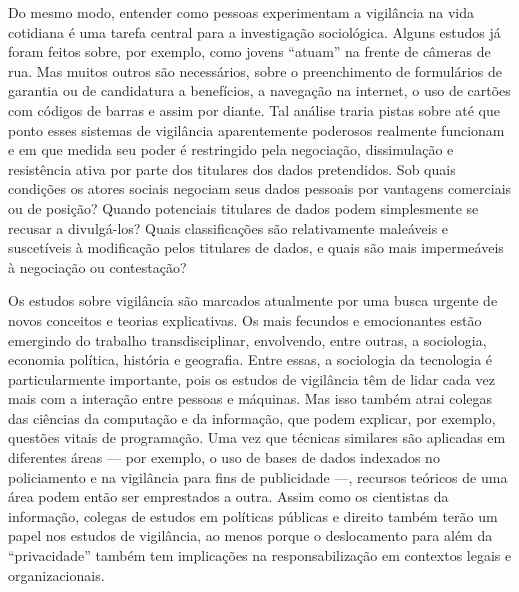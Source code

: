Do mesmo modo, entender como pessoas experimentam a vigilância na vida
cotidiana é uma tarefa central para a investigação sociológica. Alguns
estudos já foram feitos sobre, por exemplo, como jovens ``atuam'' na
frente de câmeras de rua. Mas muitos outros são necessários, sobre o
preenchimento de formulários de garantia ou de candidatura a benefícios,
a navegação na internet, o uso de cartões com códigos de barras e assim
por diante. Tal análise traria pistas sobre até que ponto esses sistemas
de vigilância aparentemente poderosos realmente funcionam e em que
medida seu poder é restringido pela negociação, dissimulação e
resistência ativa por parte dos titulares dos dados pretendidos. Sob
quais condições os atores sociais negociam seus dados pessoais por
vantagens comerciais ou de posição? Quando potenciais titulares de dados
podem simplesmente se recusar a divulgá-los? Quais classificações são
relativamente maleáveis e suscetíveis à modificação pelos titulares de
dados, e quais são mais impermeáveis à negociação ou contestação?

Os estudos sobre vigilância são marcados atualmente por uma busca
urgente de novos conceitos e teorias explicativas. Os mais fecundos e
emocionantes estão emergindo do trabalho transdisciplinar, envolvendo,
entre outras, a sociologia, economia política, história e geografia.
Entre essas, a sociologia da tecnologia é particularmente importante,
pois os estudos de vigilância têm de lidar cada vez mais com a interação
entre pessoas e máquinas. Mas isso também atrai colegas das ciências da
computação e da informação, que podem explicar, por exemplo, questões
vitais de programação. Uma vez que técnicas similares são aplicadas em
diferentes áreas --- por exemplo, o uso de bases de dados indexados no
policiamento e na vigilância para fins de publicidade ---, recursos
teóricos de uma área podem então ser emprestados a outra. Assim como os
cientistas da informação, colegas de estudos em políticas públicas e
direito também terão um papel nos estudos de vigilância, ao menos porque
o deslocamento para além da ``privacidade'' também tem implicações na
responsabilização em contextos legais e organizacionais.

